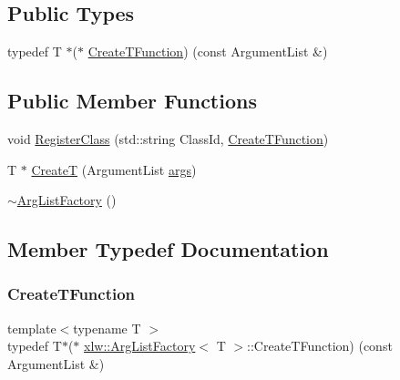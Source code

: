 \subsection*{Public Types}
\begin{DoxyCompactItemize}
\item 
typedef T $\ast$($\ast$ \hyperlink{classxlw_1_1ArgListFactory_a2bd565ada3ddbebcec91aea216f90e22}{Create\+T\+Function}) (const Argument\+List \&)
\end{DoxyCompactItemize}
\subsection*{Public Member Functions}
\begin{DoxyCompactItemize}
\item 
void \hyperlink{classxlw_1_1ArgListFactory_a5d81eab40e16198ecf994f6404792550}{Register\+Class} (std\+::string Class\+Id, \hyperlink{classxlw_1_1ArgListFactory_a2bd565ada3ddbebcec91aea216f90e22}{Create\+T\+Function})
\item 
T $\ast$ \hyperlink{classxlw_1_1ArgListFactory_a42e5fdbde035d3ab8bd383a0f32bc35f}{CreateT} (Argument\+List \hyperlink{path__generation_8h_a75c13cde2074f502cc4348c70528572d}{args})
\item 
\hyperlink{classxlw_1_1ArgListFactory_a5f919feedf0ee38addb2ad97a20c9c50}{$\sim$\+Arg\+List\+Factory} ()
\end{DoxyCompactItemize}


\subsection{Member Typedef Documentation}
\hypertarget{classxlw_1_1ArgListFactory_a2bd565ada3ddbebcec91aea216f90e22}{}\label{classxlw_1_1ArgListFactory_a2bd565ada3ddbebcec91aea216f90e22} 
\subsubsection{\texorpdfstring{Create\+T\+Function}{CreateTFunction}}
{\footnotesize\ttfamily template$<$typename T $>$ \\
typedef T$\ast$($\ast$ \hyperlink{classxlw_1_1ArgListFactory}{xlw\+::\+Arg\+List\+Factory}$<$ T $>$\+::Create\+T\+Function) (const Argument\+List \&)}



